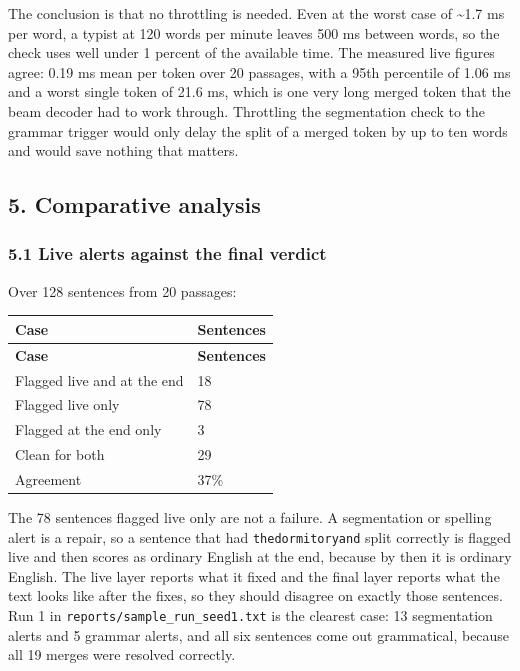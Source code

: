 \documentclass[11pt,a4paper]{article}
\begin{document}
The conclusion is that no throttling is needed. Even at the worst case of \textasciitilde{}1.7 ms per word, a typist at 120 words per minute leaves 500 ms between words, so the check uses well under 1 percent of the available time. The measured live figures agree: 0.19 ms mean per token over 20 passages, with a 95th percentile of 1.06 ms and a worst single token of 21.6 ms, which is one very long merged token that the beam decoder had to work through. Throttling the segmentation check to the grammar trigger would only delay the split of a merged token by up to ten words and would save nothing that matters.

\subsection*{5. Comparative analysis}

\subsubsection*{5.1 Live alerts against the final verdict}

Over 128 sentences from 20 passages:

{\small
\setlength{\tabcolsep}{4pt}
\begin{longtable}{ll}
\toprule
\textbf{Case} & \textbf{Sentences} \\
\midrule
\endfirsthead
\toprule
\textbf{Case} & \textbf{Sentences} \\
\midrule
\endhead
Flagged live and at the end & 18 \\
Flagged live only & 78 \\
Flagged at the end only & 3 \\
Clean for both & 29 \\
Agreement & 37\% \\
\bottomrule
\end{longtable}}

The 78 sentences flagged live only are not a failure. A segmentation or spelling alert is a repair, so a sentence that had \texttt{thedormitoryand} split correctly is flagged live and then scores as ordinary English at the end, because by then it is ordinary English. The live layer reports what it fixed and the final layer reports what the text looks like after the fixes, so they should disagree on exactly those sentences. Run 1 in \texttt{reports/\allowbreak{}sample\_\allowbreak{}run\_\allowbreak{}seed1.\allowbreak{}txt} is the clearest case: 13 segmentation alerts and 5 grammar alerts, and all six sentences come out grammatical, because all 19 merges were resolved correctly.
\end{document}
